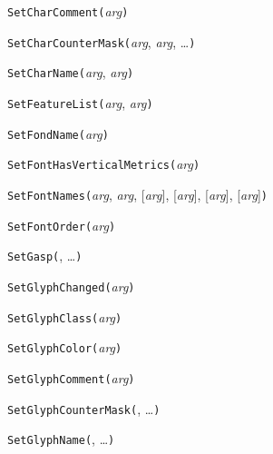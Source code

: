 
\noindent\texttt{SetCharComment(}\textit{arg}\texttt{)}


\noindent\texttt{SetCharCounterMask(}\textit{arg}, \textit{arg}, \ldots\texttt{)}


\noindent\texttt{SetCharName(}\textit{arg}, \textit{arg}\texttt{)}


\noindent\texttt{SetFeatureList(}\textit{arg}, \textit{arg}\texttt{)}


\noindent\texttt{SetFondName(}\textit{arg}\texttt{)}


\noindent\texttt{SetFontHasVerticalMetrics(}\textit{arg}\texttt{)}


\noindent\texttt{SetFontNames(}\textit{arg}, \textit{arg}, [\textit{arg}], [\textit{arg}], [\textit{arg}], [\textit{arg}]\texttt{)}


\noindent\texttt{SetFontOrder(}\textit{arg}\texttt{)}


\noindent\texttt{SetGasp(}, \ldots\texttt{)}


\noindent\texttt{SetGlyphChanged(}\textit{arg}\texttt{)}


\noindent\texttt{SetGlyphClass(}\textit{arg}\texttt{)}


\noindent\texttt{SetGlyphColor(}\textit{arg}\texttt{)}


\noindent\texttt{SetGlyphComment(}\textit{arg}\texttt{)}


\noindent\texttt{SetGlyphCounterMask(}, \ldots\texttt{)}


\noindent\texttt{SetGlyphName(}, \ldots\texttt{)}


